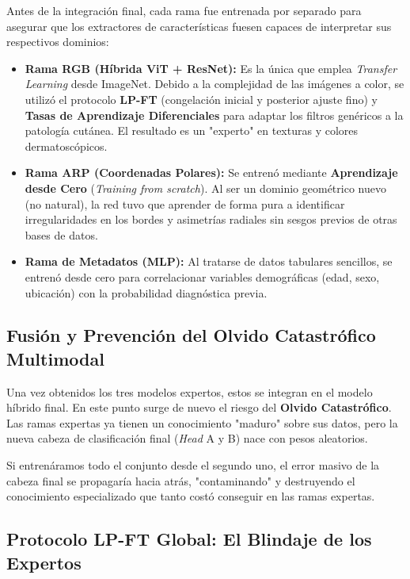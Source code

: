 Antes de la integración final, cada rama fue entrenada por separado para asegurar que los extractores de características fuesen capaces de interpretar sus respectivos dominios:

\begin{itemize}
	\item \textbf{Rama RGB (Híbrida ViT + ResNet):} Es la única que emplea \textit{Transfer Learning} desde ImageNet. Debido a la complejidad de las imágenes a color, se utilizó el protocolo \textbf{LP-FT} (congelación inicial y posterior ajuste fino) y \textbf{Tasas de Aprendizaje Diferenciales} para adaptar los filtros genéricos a la patología cutánea. El resultado es un "experto" en texturas y colores dermatoscópicos.
	\item \textbf{Rama ARP (Coordenadas Polares):} Se entrenó mediante \textbf{Aprendizaje desde Cero} (\textit{Training from scratch}). Al ser un dominio geométrico nuevo (no natural), la red tuvo que aprender de forma pura a identificar irregularidades en los bordes y asimetrías radiales sin sesgos previos de otras bases de datos.
	\item \textbf{Rama de Metadatos (MLP):} Al tratarse de datos tabulares sencillos, se entrenó desde cero para correlacionar variables demográficas (edad, sexo, ubicación) con la probabilidad diagnóstica previa.
\end{itemize}

\subsection{Fusión y Prevención del Olvido Catastrófico Multimodal}

Una vez obtenidos los tres modelos expertos, estos se integran en el modelo híbrido final. En este punto surge de nuevo el riesgo del \textbf{Olvido Catastrófico}. Las ramas expertas ya tienen un conocimiento "maduro" sobre sus datos, pero la nueva cabeza de clasificación final (\textit{Head} A y B) nace con pesos aleatorios.

Si entrenáramos todo el conjunto desde el segundo uno, el error masivo de la cabeza final se propagaría hacia atrás, "contaminando" y destruyendo el conocimiento especializado que tanto costó conseguir en las ramas expertas.

\subsection{Protocolo LP-FT Global: El Blindaje de los Expertos}


